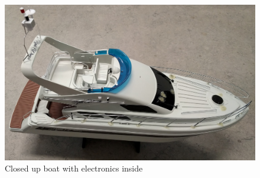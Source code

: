 \begin{figure}[H]
\centering
\includegraphics[width=0.7\linewidth]{Images/Implementation/boat_hardware_enclosed}
\caption{Closed up boat with electronics inside}
\label{fig:boat_closed}
\end{figure}












